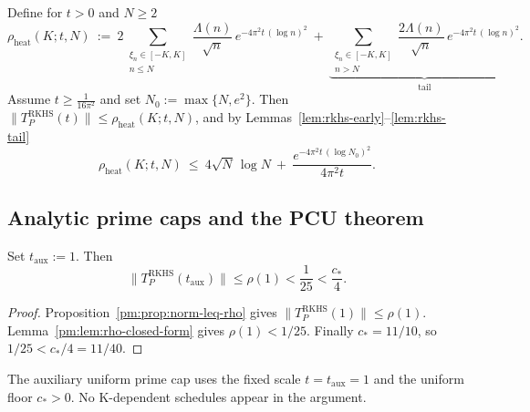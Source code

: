 \begin{proposition}\label{prop:rkhs-early-tail-cap}
Define for $t>0$ and $N\ge2$
\[
\rho_{\mathrm{heat}}(K;t,N)\ :=\
2\sum_{\substack{\xi_n\in[-K,K]\\ n\le N}}\frac{\Lambda(n)}{\sqrt{n}}\,e^{-4\pi^2 t\,(\log n)^2}
\ +\ \underbrace{\sum_{\substack{\xi_n\in[-K,K]\\ n>N}}\frac{2\Lambda(n)}{\sqrt{n}}\,e^{-4\pi^2 t\,(\log n)^2}}_{\text{tail}}.
\]
Assume $t\ge \tfrac{1}{16\pi^2}$ and set $N_0:=\max\{N,e^2\}$. Then $\|T_P^{\mathrm{RKHS}}(t)\|\le \rho_{\mathrm{heat}}(K;t,N)$, and by Lemmas~\ref{lem:rkhs-early}--\ref{lem:rkhs-tail}
\[
\rho_{\mathrm{heat}}(K;t,N)\ \le\ 4\sqrt{N}\,\log N\ +\ \frac{e^{-4\pi^2 t\,(\log N_0)^2}}{4\pi^2 t}.
\]
\end{proposition}

\subsection*{Analytic prime caps and the PCU theorem}

\begin{corollary}\label{cor:pcu-uniform}
Set $t_{\mathrm{aux}}:=1$. Then
\[
  \|T_P^{\mathrm{RKHS}}(t_{\mathrm{aux}})\|
  \le \rho(1)
  < \frac{1}{25}
  < \frac{c_*}{4}.
\]
\end{corollary}

\begin{proof}
Proposition~\ref{pm:prop:norm-leq-rho} gives
$\|T_P^{\mathrm{RKHS}}(1)\|\le \rho(1)$.
Lemma~\ref{pm:lem:rho-closed-form} gives $\rho(1)<1/25$.
Finally $c_*=11/10$, so $1/25 < c_*/4 = 11/40$.
\end{proof}

\begin{remark}
The auxiliary uniform prime cap uses the fixed scale $t=t_{\mathrm{aux}}=1$
and the uniform floor $c_*>0$. No K-dependent schedules appear in the argument.
\end{remark}
